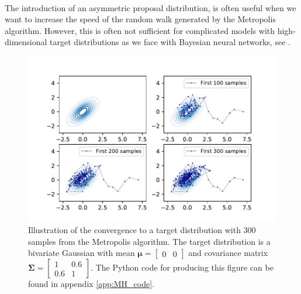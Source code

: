 \\
The introduction of an asymmetric proposal distribution, is often useful when we want to increase the speed of the random walk generated by the Metropolis algorithm. However, this is often not sufficient for complicated models with high-dimensional target distributions as we face with Bayesian neural networks, see \cite{gelmanbda04}.
\begin{figure}
    \centering
    \includegraphics[width=\textwidth, height=\textheight, keepaspectratio]{pics/mh_randomWalk_behavior.pdf}
    \caption{Illustration of the convergence to a target distribution with 300 samples from the Metropolis algorithm. The target distribution is a bivariate Gaussian with mean 
        $\boldsymbol{\mu}= \begin{bmatrix}
            0 & 0
            \end{bmatrix}$ and covariance matrix
            $\boldsymbol{\Sigma}= 
            \begin{bmatrix}
                1 & 0.6\\
                0.6 & 1   
            \end{bmatrix}$. The Python code for producing this figure can be found in appendix \ref{app:MH_code}.
    }
    \label{fig:MH_sampling}
\end{figure}
\clearpage

